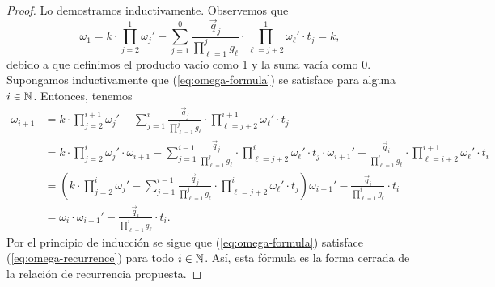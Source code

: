 \begin{proof}
	Lo demostramos inductivamente. Observemos que
	\begin{equation*}
		\omega_1 =
		k \cdot \prod_{j=2}^{1} \omega_j'
		- \sum_{j=1}^{0}\frac{\vec{q}_j}{\prod_{\ell=1}^{j}g_\ell}
		\cdot \prod_{\ell=j+2}^{1}\omega_\ell' \cdot t_j
		= k,
	\end{equation*}
	debido a que definimos el producto vacío como 1 y la suma vacía como 0. Supongamos
	inductivamente que (\ref{eq:omega-formula}) se satisface para alguna $i \in \mathbb{N}$. Entonces,
	tenemos
	\begin{align*}
		\omega_{i + 1}
		&=
		k \cdot \prod_{j=2}^{i + 1} \omega_j'
		- \sum_{j=1}^{i}\frac{\vec{q}_j}{\prod_{\ell=1}^{j}g_\ell}
		\cdot \prod_{\ell=j+2}^{i + 1}\omega_\ell' \cdot t_j \\
		&=
		k \cdot \prod_{j=2}^{i} \omega_j' \cdot \omega_{i+1}
		- \sum_{j=1}^{i - 1}\frac{\vec{q}_j}{\prod_{\ell=1}^{j}g_\ell}
		\cdot \prod_{\ell=j+2}^{i}\omega_\ell' \cdot t_j \cdot \omega_{i + 1}'
		- \frac{\vec{q}_i}{\prod_{\ell = 1}^{i}g_\ell}
		\cdot \prod_{\ell = i + 2}^{i + 1}\omega_\ell' \cdot t_i \\
		&= 
		\left( k \cdot \prod_{j=2}^{i} \omega_j'
		- \sum_{j=1}^{i - 1}\frac{\vec{q}_j}{\prod_{\ell=1}^{j}g_\ell}
		\cdot \prod_{\ell=j+2}^{i}\omega_\ell' \cdot t_j \right) \omega_{i+1}'
		- \frac{\vec{q}_i}{\prod_{\ell = 1}^{i}g_\ell} \cdot t_i  \\
		&= \omega_i \cdot \omega_{i + 1}' - \frac{\vec{q}_i}{\prod_{\ell = 1}^{i}g_\ell} \cdot t_i.
	\end{align*}
	Por el principio de inducción se sigue que (\ref{eq:omega-formula}) satisface
	(\ref{eq:omega-recurrence}) para todo $i \in \mathbb{N}$. Así, esta fórmula es la forma cerrada de la
	relación de recurrencia propuesta.
\end{proof}

